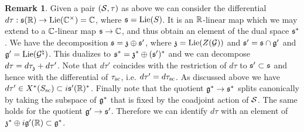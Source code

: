 \documentclass{article}
\theoremstyle{definition}
\newtheorem{rem}[thm]{Remark}
\numberwithin{equation}{section}
\renewcommand{\-}{\hyp{}}
\begin{document}
\begin{rem} \label{rem:hcpar}
	Given a pair $(\mathcal{S},\tau)$ as above we can consider the differential $d\tau : \mathfrak{s}(\mathbb{R}) \to \textrm{Lie}(\mathbb{C}^\times)=\mathbb{C}$, where $\mathfrak{s}=\textrm{Lie}(S)$. It is an $\mathbb{R}$-linear map which we may extend to a $\mathbb{C}$-linear map $\mathfrak{s} \to \mathbb{C}$, and thus obtain an element of the dual space $\mathfrak{s}^*$. We have the decomposition $\mathfrak{s}=\mathfrak{z} \oplus \mathfrak{s}'$, where $\mathfrak{z}=\textrm{Lie}(Z(\mathcal{G}))$ and $\mathfrak{s}'=\mathfrak{s} \cap \mathfrak{g}'$ and $\mathfrak{g}'=\textrm{Lie}(\mathcal{G}^\natural)$. This dualizes to $\mathfrak{s}^*=\mathfrak{z}^* \oplus (\mathfrak{s}')^*$ and we can decompose $d\tau = d\tau_{\mathfrak{z}} + d\tau'$. Note that $d\tau'$ coincides with the restriction of $d\tau$ to $\mathfrak{s'} \subset \mathfrak{s}$ and hence with the differential of $\tau_{\textrm{sc}}$, i.e. $d\tau'=d\tau_{\textrm{sc}}$. As discussed above we have $d\tau' \in X^*(S_{\textrm{sc}}) \subset i\mathfrak{s}'(\mathbb{R})^*$. Finally note that the quotient $\mathfrak{g}^* \to \mathfrak{s}^*$ splits canonically by taking the subspace of $\mathfrak{g}^*$ that is fixed by the coadjoint action of $\mathcal{S}$. The same holds for the quotient $\mathfrak{g}' \to \mathfrak{s}'$. Therefore we can identify $d\tau$ with an element of $\mathfrak{z}^* \oplus i\mathfrak{g}'(\mathbb{R}) \subset \mathfrak{g}^*$.
\end{rem}
\end{document}

